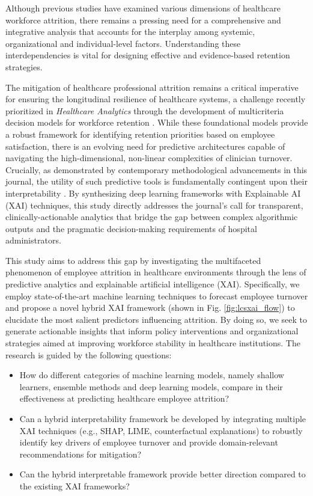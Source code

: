 \documentclass[a4paper,fleqn]{cas-sc}
\begin{document}
Although previous studies have examined various dimensions of healthcare workforce attrition, there remains a pressing need for a comprehensive and integrative analysis that accounts for the interplay among systemic, organizational and individual-level factors. Understanding these interdependencies is vital for designing effective and evidence-based retention strategies.

The mitigation of healthcare professional attrition remains a critical imperative for ensuring the longitudinal resilience of healthcare systems, a challenge recently prioritized in \textit{Healthcare Analytics} through the development of multicriteria decision models for workforce retention \cite{DICAPRIO2025100403}. While these foundational models provide a robust framework for identifying retention priorities based on employee satisfaction, there is an evolving need for predictive architectures capable of navigating the high-dimensional, non-linear complexities of clinician turnover. Crucially, as demonstrated by contemporary methodological advancements in this journal, the utility of such predictive tools is fundamentally contingent upon their interpretability \cite{BAIRY2025100407}. By synthesizing deep learning frameworks with Explainable AI (XAI) techniques, this study directly addresses the journal’s call for transparent, clinically-actionable analytics that bridge the gap between complex algorithmic outputs and the pragmatic decision-making requirements of hospital administrators.

This study aims to address this gap by investigating the multifaceted phenomenon of employee attrition in healthcare environments through the lens of predictive analytics and explainable artificial intelligence (XAI). Specifically, we employ state-of-the-art machine learning techniques to forecast employee turnover and propose a novel hybrid XAI framework (shown in Fig. \ref{fig:lcsxai_flow}) to elucidate the most salient predictors influencing attrition. By doing so, we seek to generate actionable insights that inform policy interventions and organizational strategies aimed at improving workforce stability in healthcare institutions.
The research is guided by the following questions:
\begin{itemize}
 
    \item [RQ1:] How do different categories of machine learning models, namely shallow learners, ensemble methods and deep learning models, compare in their effectiveness at predicting healthcare employee attrition?

    \item [RQ2:] Can a hybrid interpretability framework be developed by integrating multiple XAI techniques (e.g., SHAP, LIME, counterfactual explanations) to robustly identify key drivers of employee turnover and provide domain-relevant recommendations for mitigation?
    
    \item [RQ3:] Can the hybrid interpretable framework provide better direction compared to the existing XAI frameworks?
\end{itemize}
\end{document}
